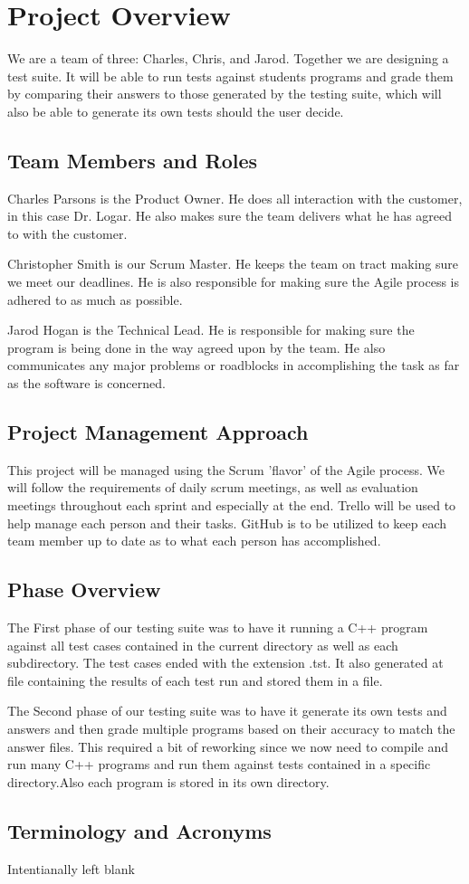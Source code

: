 

\chapter{Project Overview}
We are a team of three: Charles, Chris, and Jarod. Together we are designing a test suite. It will be able to run tests against students programs and grade them by comparing their answers to those generated by the testing suite, which will also be able to generate its own tests should the user decide. 



\section{Team Members and Roles}
Charles Parsons is the Product Owner. He does all interaction with the customer, in this case Dr. Logar. He also makes sure the team delivers what he has agreed to with the customer.

Christopher Smith is our Scrum Master. He keeps the team on tract making sure we meet our deadlines. He is also responsible for making sure the Agile process is adhered to as much as possible.

Jarod Hogan is the Technical Lead. He is responsible for making sure the program is being done in the way agreed upon by the team. He also communicates any major problems or roadblocks in accomplishing the task as far as the software is concerned. 


\section{Project  Management Approach}
This project will be managed using the Scrum 'flavor' of the Agile process. We will follow the requirements of daily scrum meetings, as well as evaluation meetings throughout each sprint and especially at the end. Trello will be used to help manage each person and their tasks. GitHub is to be utilized to keep each team member up to date as to what each person has accomplished.


\section{Phase  Overview}
The First phase of our testing suite was to have it running a C++ program against all test cases contained in the current directory as well as each subdirectory. The test cases ended with the extension .tst. It also generated at file containing the
results of each test run and stored them in a file.

The Second phase of our testing suite was to have it generate its own tests and answers and then grade multiple programs based on their accuracy to match the answer files. This required a bit of reworking since we now need to compile and run many C++ programs and run them against tests contained in a specific directory.Also each program is stored in its own directory.


\section{Terminology and Acronyms}
Intentianally left blank
